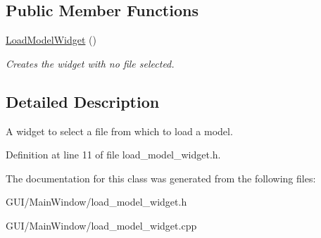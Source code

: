 \subsection*{Public Member Functions}
\begin{DoxyCompactItemize}
\item 
\mbox{\label{classLoadModelWidget_a1d65aba05b2bcc5f9940cb1fede85b1a}} 
\hyperlink{classLoadModelWidget_a1d65aba05b2bcc5f9940cb1fede85b1a}{Load\+Model\+Widget} ()
\begin{DoxyCompactList}\small\item\em Creates the widget with no file selected. \end{DoxyCompactList}\end{DoxyCompactItemize}


\subsection{Detailed Description}
A widget to select a file from which to load a model. 

Definition at line 11 of file load\+\_\+model\+\_\+widget.\+h.



The documentation for this class was generated from the following files\+:\begin{DoxyCompactItemize}
\item 
G\+U\+I/\+Main\+Window/load\+\_\+model\+\_\+widget.\+h\item 
G\+U\+I/\+Main\+Window/load\+\_\+model\+\_\+widget.\+cpp\end{DoxyCompactItemize}
